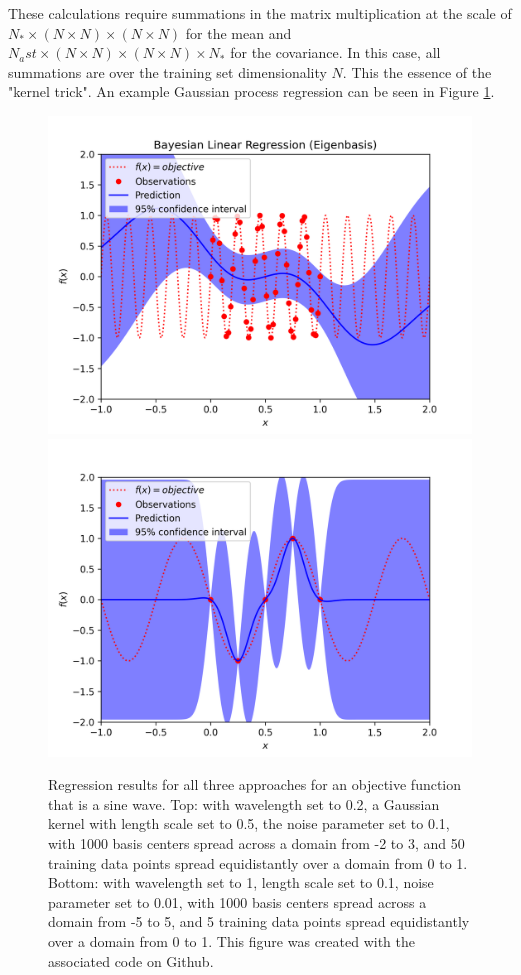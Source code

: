 \documentclass{article}
\begin{document}
These calculations require summations in the matrix multiplication at the scale of $N_\ast \times (N \times N) \times (N \times N)$ for the mean and $N_ast \times (N \times N) \times (N \times N) \times N_\ast$ for the covariance. In this case, all summations are over the training set dimensionality $N$. This the essence of the "kernel trick". An example Gaussian process regression can be seen in Figure \ref{fig:example_regression}.

\begin{figure}
    \begin{center}
    \includegraphics[width=0.75\linewidth]{regression_results}
    \includegraphics[width=0.75\linewidth]{regression_results2}
    \caption{Regression results for all three approaches for an objective function that is a sine wave. Top: with wavelength set to 0.2, a Gaussian kernel with length scale set to 0.5, the noise parameter set to 0.1, with 1000 basis centers spread across a domain from -2 to 3, and 50 training data points spread equidistantly over a domain from 0 to 1. Bottom: with wavelength set to 1, length scale set to 0.1, noise parameter set to 0.01, with 1000 basis centers spread across a domain from -5 to 5, and 5 training data points spread equidistantly over a domain from 0 to 1. This figure was created with the associated code on Github.}
    \label{fig:example_regression}
    \end{center}
\end{figure}
\end{document}

